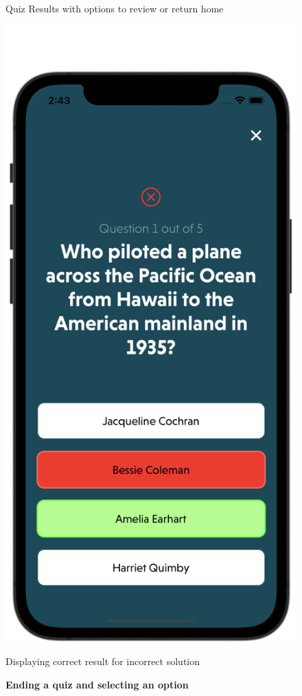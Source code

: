 \begin{figure}[H]
\begin{minipage}[b]{0.43\linewidth}
        \caption{Quiz Results with options to review or return home}
    \end{minipage}
    \hspace{0.1\linewidth}
    \begin{minipage}[b]{0.43\linewidth}
        \centering
        \includegraphics[width=\linewidth]{Mobile UI/Displaying correct result.png}
        \caption{Displaying correct result for incorrect solution}
    \end{minipage}
    \vspace{0.5cm}
    \caption{\textbf{Ending a quiz and selecting an option}}
\end{figure}


